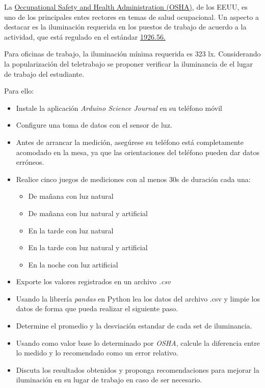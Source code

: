 \documentclass[12pt]{article}
\begin{document}
\setlength{\parindent}{0em}

La \href{https://www.osha.gov/}{Occupational Safety and Health Administration (OSHA)}, de los EEUU, es uno de los principales entes rectores en temas de salud ocupacional.
Un aspecto a destacar es la iluminación requerida en los puestos de trabajo de acuerdo a la actividad, que está regulado en el estándar \href{https://www.osha.gov/laws-regs/regulations/standardnumber/1926/1926.56}{1926.56.}

Para oficinas de trabajo, la iluminación mínima requerida es 323 \si{\lux}. 
Considerando la popularización del teletrabajo se proponer verificar la iluminancia de el lugar de trabajo del estudiante.

Para ello:

\begin{itemize}
    \item Instale la aplicación \textit{Arduino Science Journal} en su teléfono móvil
    \item Configure una toma de datos con el sensor de luz.
    \item Antes de arrancar la medición, asegúrese su teléfono está completamente acomodado en la mesa, ya que las orientaciones del teléfono pueden dar datos erróneos.
    \item Realice cinco juegos de mediciones con al menos 30s de duración cada una: 
    \begin{itemize}
        \item De mañana con luz natural
        \item De mañana con luz natural y artificial
        \item En la tarde con luz natural
        \item En la tarde con luz natural y artificial
        \item En la noche con luz artificial
    \end{itemize}
    \item Exporte los valores registrados en un archivo \emph{.csv}
    \item Usando la librería \emph{pandas} en Python lea los datos del archivo .csv y limpie los datos de forma que pueda realizar el siguiente paso.   
    \item Determine el promedio y la desviación estandar de cada set de iluminancia.
    \item Usando como valor base lo determinado por \textit{OSHA}, calcule la diferencia entre lo medido y lo recomendado como un error relativo.
    \item Discuta los resultados obtenidos y proponga recomendaciones para mejorar la iluminación en su lugar de trabajo en caso de ser necesario.
\end{itemize}
\end{document}
